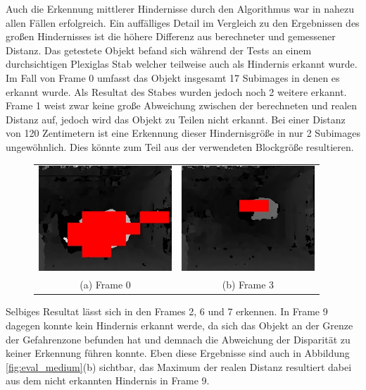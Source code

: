 \noindent
Auch die Erkennung mittlerer Hindernisse durch den Algorithmus war in nahezu allen Fällen erfolgreich. Ein auffälliges Detail im Vergleich zu den Ergebnissen des großen Hindernisses ist die höhere Differenz aus berechneter und gemessener Distanz. Das getestete Objekt befand sich während der Tests an einem durchsichtigen Plexiglas Stab welcher teilweise auch als Hindernis erkannt wurde. Im Fall von Frame 0 umfasst das Objekt insgesamt 17 Subimages in denen es erkannt wurde. Als Resultat des Stabes wurden jedoch noch 2 weitere erkannt. Frame 1 weist zwar keine große Abweichung zwischen der berechneten und realen Distanz auf, jedoch wird das Objekt zu Teilen nicht erkannt. Bei einer Distanz von 120 Zentimetern ist eine Erkennung dieser Hindernisgröße in nur 2 Subimages ungewöhnlich. Dies könnte zum Teil aus der verwendeten Blockgröße resultieren.

\begin{figure}[h]
	\centering
	\begin{tabular}{cc}
	\includegraphics[width=5cm]{img/evaluation/medium_test_0_disparity}&
	\includegraphics[width=5cm]{img/evaluation/medium_test_1_disparity}\\
	(a) Frame 0 &  (b) Frame 3
	\end{tabular}
	\caption{}
	\label{fig:eval_medium_fails}
\end{figure}

\noindent
Selbiges Resultat lässt sich in den Frames 2, 6 und 7 erkennen. In Frame 9 dagegen konnte kein Hindernis erkannt werde, da sich das Objekt an der Grenze der Gefahrenzone befunden hat und demnach die Abweichung der Disparität zu keiner Erkennung führen konnte. Eben diese Ergebnisse sind auch in Abbildung \ref{fig:eval_medium}(b) sichtbar, das Maximum der realen Distanz resultiert dabei aus dem nicht erkannten Hindernis in Frame 9.\\

